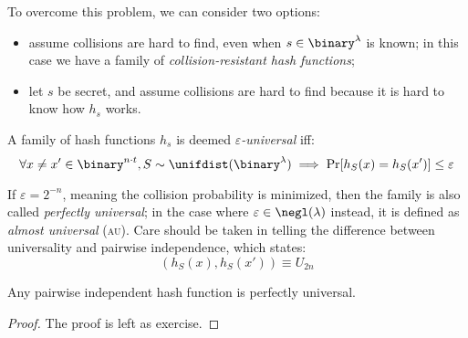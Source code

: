 To overcome this problem, we can consider two options:
\begin{itemize}
    \item assume collisions are hard to find, even when $s \in \binary^{\lambda}$ is known; in this case we have a family of \textit{collision-resistant hash functions};
    \item let $s$ be secret, and assume collisions are hard to find because it is hard to know how $h_s$ works.
\end{itemize}

\begin{definition}
    A family of hash functions $h_s$ is deemed \emph{$\varepsilon$-universal} iff:
    \[
        \forall x \neq x' \in \binary^{n \cdot t}, S \sim \unifdist(\binary^\lambda) \implies \Pr[h_S(x) = h_S(x')] \leq \varepsilon \qedhere
    \]
\end{definition}

If $\varepsilon = 2^{-n}$, meaning the collision probability is minimized, then the family is also called \emph{perfectly universal}; in the case where $\varepsilon \in \negl(\lambda)$ instead, it is defined as \emph{almost universal} (\textsc{au}). Care should be taken in telling the difference between universality and pairwise independence, which states:
\[
    (h_S(x), h_S(x')) \equiv U_{2n}
\]

\begin{lemma}
    Any pairwise independent hash function is perfectly universal.
\end{lemma}

\begin{proof} The proof is left as exercise.
\end{proof}

